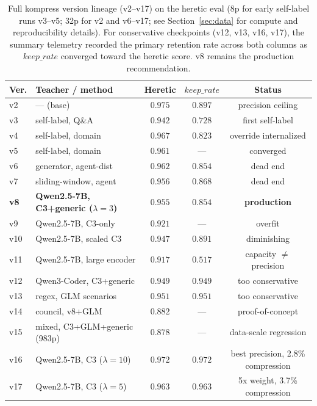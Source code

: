 \begin{table}[h]
\centering
\caption{Full kompress version lineage (v2--v17) on the heretic eval (8p for
early self-label runs v3--v5; 32p for v2 and v6--v17; see Section~\ref{sec:data}
for compute and reproducibility details). For conservative checkpoints
(v12, v13, v16, v17), the summary telemetry recorded the primary retention rate
across both columns as $\mathit{keep\_rate}$ converged toward the heretic score.
v8 remains the production recommendation.}
\label{tab:lineage}
\begin{tabular}{llccc}
\toprule
Ver. & Teacher / method & Heretic & $\mathit{keep\_rate}$ & Status \\
\midrule
v2  & --- (base)                   & $0.975$ & $0.897$ & precision ceiling \\
v3  & self-label, Q\&A             & $0.942$ & $0.728$ & first self-label \\
v4  & self-label, domain           & $0.967$ & $0.823$ & override internalized \\
v5  & self-label, domain           & $0.961$ & ---     & converged \\
v6  & generator, agent-dist        & $0.962$ & $0.854$ & dead end \\
v7  & sliding-window, agent        & $0.956$ & $0.868$ & dead end \\
\textbf{v8}  & \textbf{Qwen2.5-7B, C3+generic ($\lambda{=}3$)} & $\mathbf{0.955}$ & $0.854$ & \textbf{production} \\
v9  & Qwen2.5-7B, C3-only          & $0.921$ & ---     & overfit \\
v10 & Qwen2.5-7B, scaled C3        & $0.947$ & $0.891$ & diminishing \\
v11 & Qwen2.5-7B, large encoder    & $0.917$ & $0.517$ & capacity $\neq$ precision \\
v12 & Qwen3-Coder, C3+generic      & $0.949$ & $0.949$ & too conservative \\
v13 & regex, GLM scenarios         & $0.951$ & $0.951$ & too conservative \\
v14 & council, v8+GLM              & $0.882$ & ---     & proof-of-concept \\
v15 & mixed, C3+GLM+generic (983p) & $0.878$ & ---     & data-scale regression \\
v16 & Qwen2.5-7B, C3 ($\lambda{=}10$) & $0.972$ & $0.972$ & best precision, 2.8\% compression \\
v17 & Qwen2.5-7B, C3 ($\lambda{=}5$)  & $0.963$ & $0.963$ & 5x weight, 3.7\% compression \\
\bottomrule
\end{tabular}
\end{table}

